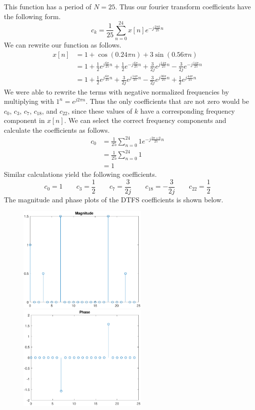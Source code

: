 \documentclass[12pt]{article}
\begin{document}
This function has a period of \(N=25\). Thus our fourier transform coefficients have the following form.
\[c_k=\frac{1}{25}\sum_{n=0}^{24}x[n] e^{-j\frac{2\pi k}{25}n}\]
We can rewrite our function as follows.
\begin{align*}
    x[n] &= 1+\cos(0.24\pi n)+3\sin(0.56\pi n)\\
    &=1+\frac{1}{2}e^{j\frac{6\pi}{25}n}+\frac{1}{2}e^{-j\frac{6\pi}{25}n}+\frac{3}{2j}e^{j\frac{14\pi}{25}n}-\frac{3}{2j}e^{-j\frac{14\pi}{25}n}\\
    &=1+\frac{1}{2}e^{j\frac{6\pi}{25}n}+\frac{3}{2j}e^{j\frac{14\pi}{25}n}-\frac{3}{2j}e^{j\frac{36\pi}{25}n}+\frac{1}{2}e^{j\frac{44\pi}{25}n}
\end{align*}
We were able to rewrite the terms with negative normalized frequencies by multiplying with \(1^n=e^{j2\pi n}\).
Thus the only coefficients that are not zero would be \(c_0\), \(c_3\), \(c_7\), \(c_{18}\), and \(c_{22}\), since
these values of \(k\) have a corresponding frequency component in \(x[n]\). We can select the correct
frequency components and calculate the coefficients as follows.
\begin{align*}
    c_0 &= \frac{1}{25}\sum_{n=0}^{24}1e^{-j\frac{2\pi \times 0}{25}n}\\
    &=\frac{1}{25}\sum_{n=0}^{24}1\\
    &=1
\end{align*}
Similar calculations yield the following coefficients.
\[c_0=1\qquad c_3=\frac{1}{2}\qquad c_7=\frac{3}{2j}\qquad c_{18}=-\frac{3}{2j}\qquad c_{22}=\frac{1}{2}\]
The magnitude and phase plots of the DTFS coefficients is shown below.
\begin{figure}[H]
    \begin{center}
        \includegraphics[width=2.5in]{problem4-mag.pdf}
        \includegraphics[width=2.5in]{problem4-phase.pdf}
    \end{center}
\end{figure}
\end{document}
